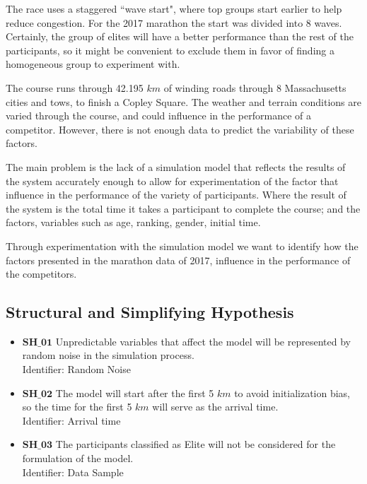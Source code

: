 \documentclass[11pt, oneside]{article}   	%
\begin{document}
The race uses a staggered ``wave start", where top groups start earlier to help reduce congestion. For the 2017 marathon the start was divided into $8$ waves. Certainly, the group of elites will have a better performance than the rest of the participants, so it might be convenient to exclude them in favor of finding a homogeneous group to experiment with.

The course runs through 42.195 $km$ of winding roads through $8$ Massachusetts cities and tows, to finish a Copley Square. The weather and terrain conditions are varied through the course, and could influence in the performance of a competitor. However, there is not enough data to predict the variability of these factors.

The main problem is the lack of a simulation model that reflects the results of the system accurately enough to allow for experimentation of the factor that influence in the performance of the variety of participants. Where the result of the system is the total time it takes a participant to complete the course; and the factors, variables such as age, ranking, gender, initial time. 

Through experimentation with the simulation model we want to identify how the factors presented in the marathon data of 2017, influence in the performance of the competitors. 

\subsection{Structural and Simplifying Hypothesis}

\begin{itemize}
\item $\textbf{SH\_01}$ Unpredictable variables that affect the model will be represented by random noise in the simulation process.\\
Identifier: Random Noise
\item $\textbf{SH\_02}$ The model will start after the first 5 $km$ to avoid initialization bias, so the time for the first 5 $km$ will serve as the arrival time.\\
Identifier: Arrival time
\item $\textbf{SH\_03}$ The participants classified as Elite will not be considered for the formulation of the model.\\
Identifier: Data Sample
\end{itemize}
\end{document}
